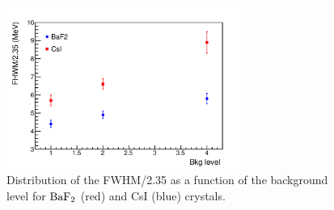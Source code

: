 \begin{figure}[htb]
\begin{center}
   \includegraphics[width=0.7\textwidth]{Figures/bkg.pdf}
\end{center}
\caption
{Distribution of the FWHM/2.35 as a function of the background level for $\rm BaF_2$ (red) and CsI (blue) crystals.}
\label{sim::fig::bkg}
\end{figure}

